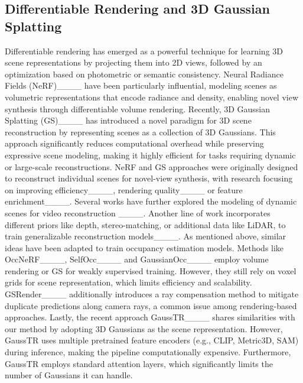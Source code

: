 \subsection{Differentiable Rendering and 3D Gaussian Splatting}
Differentiable rendering has emerged as a powerful technique for learning 3D scene representations by projecting them into 2D views, followed by an optimization based on photometric or semantic consistency.
Neural Radiance Fields (NeRF)____ have been particularly influential, modeling scenes as volumetric representations that encode radiance and density, enabling novel view synthesis through differentiable volume rendering.
Recently, 3D Gaussian Splatting (GS)____ has introduced a novel paradigm for 3D scene reconstruction by representing scenes as a collection of 3D Gaussians.
This approach significantly reduces computational overhead while preserving expressive scene modeling, making it highly efficient for tasks requiring dynamic or large-scale reconstructions.
NeRF and GS approaches were originally designed to reconstruct individual scenes for novel-view synthesis, with research focusing on improving efficiency____, rendering quality____ or feature enrichment____.
Several works have further explored the modeling of dynamic scenes for video reconstruction ____.
Another line of work incorporates different priors like depth, stereo-matching, or additional data like LiDAR, to train generalizable reconstruction models____.
As mentioned above, similar ideas have been adapted to train occupancy estimation models.
Methods like OccNeRF____, SelfOcc____ and GaussianOcc____ employ volume rendering or GS for weakly supervised training.
However, they still rely on voxel grids for scene representation, which limits efficiency and scalability.
GSRender____ additionally introduces a ray compensation method to mitigate duplicate predictions along camera rays, a common issue among rendering-based approaches.
Lastly, the recent approach GaussTR____ shares similarities with our method by adopting 3D Gaussians as the scene representation.
However, GaussTR uses multiple pretrained feature encoders (e.g., CLIP, Metric3D, SAM) during inference, making the pipeline computationally expensive.
Furthermore, GaussTR employs standard attention layers, which significantly limits the number of Gaussians it can handle.